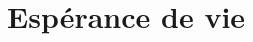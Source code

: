 \documentclass[11pt]{article}
\begin{document}
\setlength{\columnseprule}{1pt}

\section*{Espérance de vie}
\end{document}
